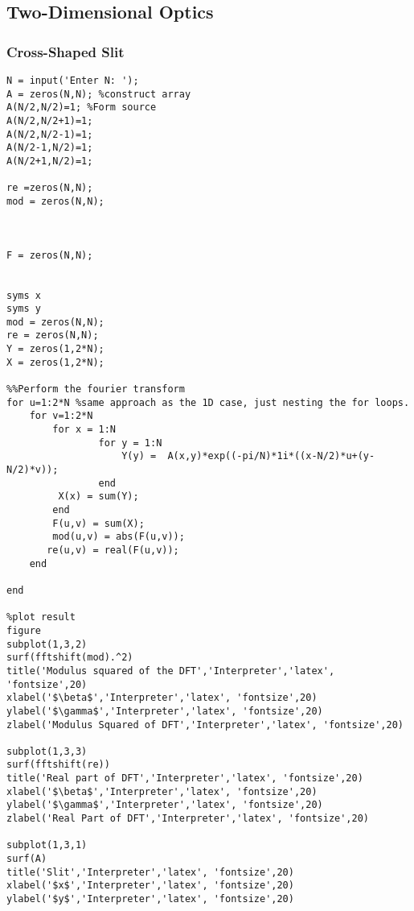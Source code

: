 \documentclass[a4paper,11pt]{article}
\begin{document}
\subsection{Two-Dimensional Optics}
\subsubsection{Cross-Shaped Slit}
\begin{lstlisting}[style=matlab-editor]
N = input('Enter N: ');
A = zeros(N,N); %construct array
A(N/2,N/2)=1; %Form source
A(N/2,N/2+1)=1;
A(N/2,N/2-1)=1;
A(N/2-1,N/2)=1;
A(N/2+1,N/2)=1;

re =zeros(N,N);
mod = zeros(N,N);



F = zeros(N,N);

          
syms x
syms y
mod = zeros(N,N);
re = zeros(N,N);
Y = zeros(1,2*N);
X = zeros(1,2*N);

%%Perform the fourier transform
for u=1:2*N %same approach as the 1D case, just nesting the for loops.
    for v=1:2*N
        for x = 1:N
                for y = 1:N
                    Y(y) =  A(x,y)*exp((-pi/N)*1i*((x-N/2)*u+(y-N/2)*v));
                end
         X(x) = sum(Y);
        end
        F(u,v) = sum(X);
        mod(u,v) = abs(F(u,v));
       re(u,v) = real(F(u,v));
    end
    
end

%plot result
figure
subplot(1,3,2)
surf(fftshift(mod).^2)
title('Modulus squared of the DFT','Interpreter','latex', 'fontsize',20)
xlabel('$\beta$','Interpreter','latex', 'fontsize',20)
ylabel('$\gamma$','Interpreter','latex', 'fontsize',20)
zlabel('Modulus Squared of DFT','Interpreter','latex', 'fontsize',20)

subplot(1,3,3)
surf(fftshift(re))
title('Real part of DFT','Interpreter','latex', 'fontsize',20)
xlabel('$\beta$','Interpreter','latex', 'fontsize',20)
ylabel('$\gamma$','Interpreter','latex', 'fontsize',20)
zlabel('Real Part of DFT','Interpreter','latex', 'fontsize',20)

subplot(1,3,1)
surf(A)
title('Slit','Interpreter','latex', 'fontsize',20)
xlabel('$x$','Interpreter','latex', 'fontsize',20)
ylabel('$y$','Interpreter','latex', 'fontsize',20)
\end{lstlisting}
\end{document}
